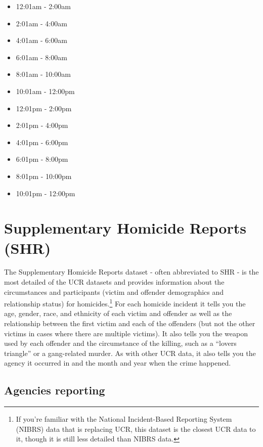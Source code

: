 \documentclass[
  12pt,
  openany]{book}
\providecommand{\tightlist}{%
  \setlength{\itemsep}{0pt}\setlength{\parskip}{0pt}}
\begin{document}
\begin{itemize}
\tightlist
\item
  12:01am - 2:00am
\item
  2:01am - 4:00am
\item
  4:01am - 6:00am
\item
  6:01am - 8:00am
\item
  8:01am - 10:00am
\item
  10:01am - 12:00pm
\item
  12:01pm - 2:00pm
\item
  2:01pm - 4:00pm
\item
  4:01pm - 6:00pm
\item
  6:01pm - 8:00pm
\item
  8:01pm - 10:00pm
\item
  10:01pm - 12:00pm
\end{itemize}

\hypertarget{shr}{%
\chapter{Supplementary Homicide Reports (SHR)}\label{shr}}

The Supplementary Homicide Reports dataset - often abbreviated to SHR - is the most detailed of the UCR datasets and provides information about the circumstances and participants (victim and offender demographics and relationship status) for homicides.\footnote{If you're familiar with the National Incident-Based Reporting System (NIBRS) data that is replacing UCR, this dataset is the closest UCR data to it, though it is still less detailed than NIBRS data.} For each homicide incident it tells you the age, gender, race, and ethnicity of each victim and offender as well as the relationship between the first victim and each of the offenders (but not the other victims in cases where there are multiple victims). It also tells you the weapon used by each offender and the circumstance of the killing, such as a ``lovers triangle'' or a gang-related murder. As with other UCR data, it also tells you the agency it occurred in and the month and year when the crime happened.

\hypertarget{agencies-reporting-1}{%
\section{Agencies reporting}\label{agencies-reporting-1}}
\end{document}
